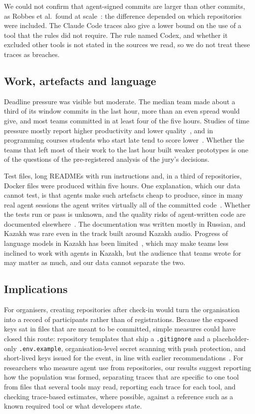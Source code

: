 \documentclass{article}
\begin{document}
We could not confirm that agent-signed commits are larger than other commits, as Robbes et al.\ found at scale~\cite{robbes2026agenticmuch}: the difference depended on which repositories were included. The Claude Code traces also give a lower bound on the use of a tool that the rules did not require. The rule named Codex, and whether it excluded other tools is not stated in the sources we read, so we do not treat these traces as breaches.

\subsection{Work, artefacts and language}
Deadline pressure was visible but moderate. The median team made about a third of its window commits in the last hour, more than an even spread would give, and most teams committed in at least four of the five hours. Studies of time pressure mostly report higher productivity and lower quality~\cite{kuutila2020timepressure}, and in programming courses students who start late tend to score lower~\cite{edwards2009behaviors,kazerouni2017procrastination}. Whether the teams that left most of their work to the last hour built weaker prototypes is one of the questions of the pre-registered analysis of the jury's decisions.

Test files, long READMEs with run instructions and, in a third of repositories, Docker files were produced within five hours. One explanation, which our data cannot test, is that agents make such artefacts cheap to produce, since in many real agent sessions the agent writes virtually all of the committed code~\cite{baumann2026swechat}. Whether the tests run or pass is unknown, and the quality risks of agent-written code are documented elsewhere~\cite{he2026cursor,zhao2025vibesafe,deng2026vibeinsecurity}. The documentation was written mostly in Russian, and Kazakh was rare even in the track built around Kazakh audio. Progress of language models in Kazakh has been limited~\cite{togmanov2025kazmmlu}, which may make teams less inclined to work with agents in Kazakh, but the audience that teams wrote for may matter as much, and our data cannot separate the two.

\subsection{Implications}
For organisers, creating repositories after check-in would turn the organisation into a record of participants rather than of registrations. Because the exposed keys sat in files that are meant to be committed, simple measures could have closed this route: repository templates that ship a \texttt{.gitignore} and a placeholder-only \texttt{.env.example}, organisation-level secret scanning with push protection, and short-lived keys issued for the event, in line with earlier recommendations~\cite{meli2019git,krause2022pushed}. For researchers who measure agent use from repositories, our results suggest reporting how the population was formed, separating traces that are specific to one tool from files that several tools may read, reporting each trace for each tool, and checking trace-based estimates, where possible, against a reference such as a known required tool or what developers state.
\end{document}
